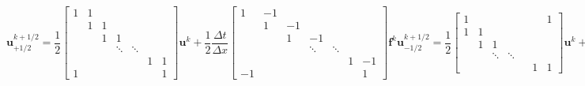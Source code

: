 \begin{subequations}
    \begin{equation}
        \label{eq:periodic1/2u_plus}
        \mathbf{{u}}_{+1/2}^{k+1/2}=\frac{1}{2}
        \begin{bmatrix}
            1 & 1 &   &        &        &   &   \\
            & 1 & 1 &        &        &   &   \\
            &   & 1 & 1      &        &   &   \\
            &   &   & \ddots & \ddots &   &   \\
            &   &   &        &        & 1 & 1 \\
            1 &   &   &        &        &   & 1
        \end{bmatrix}\mathbf{u}^k+
        \frac{1}{2}\frac{\Delta t}{\Delta x}
        \begin{bmatrix}
            1  & -1 &    &        &        &   &    \\
            & 1  & -1 &        &        &   &    \\
            &    & 1  & -1     &        &   &    \\
            &    &    & \ddots & \ddots &   &    \\
            &    &    &        &        & 1 & -1 \\
            -1 &    &    &        &        &   & 1
        \end{bmatrix}\mathbf{f}^k
    \end{equation}
    \begin{equation}
        \label{eq:periodic1/2u_minus}
        \mathbf{u}_{-1/2}^{k+1/2}=\frac{1}{2}
        \begin{bmatrix}
            1 &   &        &        & &   & 1 \\
            1 & 1 &        &        & &   &   \\
            & 1 & 1      &        & &   &   \\
            &   & \ddots & \ddots & &   &   \\
            &   &        &        & & 1 & 1
        \end{bmatrix}\mathbf{u}^k
        +\frac{1}{2}\frac{\Delta t}{\Delta x}
        \begin{bmatrix}
            -1 &    &        &        & &   & 1  \\
            1  & -1 &        &        & &   &    \\
            & 1  & -1     &        & &   &    \\
            &    & \ddots & \ddots & &   &    \\
            &    &        &        & & 1 & -1
        \end{bmatrix}\mathbf{f}^k
    \end{equation}
\end{subequations}